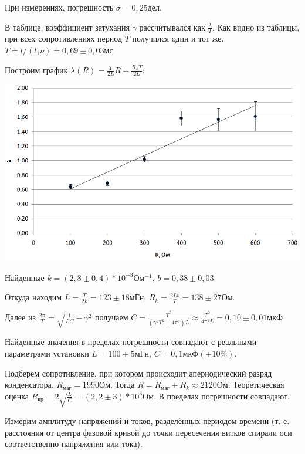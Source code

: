 \documentclass[12pt]{article}
\begin{document}
    При измерениях, погрешность $\sigma = 0,25дел$.
    
    В таблице, коэффициент затухания $\gamma$ рассчитывался как $\frac{\lambda}{T}$. Как видно из таблицы, при всех сопротивлениях период $T$ получился один и тот же. $T = l/(l_1\nu) = 0,69 \pm 0,03 мс$
    
    Построим график $\lambda(R) = \frac{T}{2L}R + \frac{R_k T}{2L}$:
    
    \includegraphics[width=15cm]{graph1.png}
    
    Найденные $k = (2,8 \pm 0,4) * 10^{-3} Ом^{-1}$, $b = 0,38 \pm 0,03$.
    
    Откуда находим $L = \frac{T}{2k} = 123 \pm 18 мГн$, $R_k = \frac{2Lb}{T} = 138 \pm 27 Ом$.
    
    Далее из $\frac{2\pi}{T} = \sqrt{\frac{1}{LC} - \gamma^2}$ получаем $C = \frac{T^2}{(\gamma^2T^2 + 4\pi^2)L} \approx \frac{T^2}{4\pi^2L} = 0,10 \pm 0,01 мкФ$
    
    Найденные значения в пределах погрешности совпадают с реальными параметрами установки $L = 100 \pm 5 мГн$, $C = 0,1 мкФ (\pm 10\%)$.
    
    Подберём сопротивление, при котором происходит апериодический разряд конденсатора. $R_{маг} = 1990 Ом$. Тогда $R = R_{маг} + R_k \approx 2120 Ом$. Теоретическая оценка $R_{кр} = 2\sqrt{\frac{L}{C}} = (2,2 \pm 3) * 10^3 Ом$. В пределах погрешности совпадают.
    
    \pagebreak
    
    Измерим амплитуду напряжений и токов, разделённых периодом времени (т. е. расстояния от центра фазовой кривой до точки пересечения витков спирали оси соответственно напряжения или тока).
    
\end{document}
